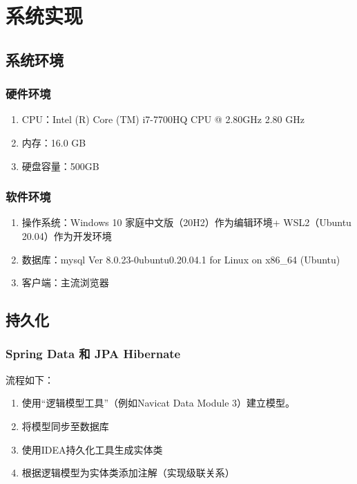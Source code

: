 
\chapter{系统实现}
\label{系统实现}

\section{系统环境}

\subsection{硬件环境}

\begin{enumerate}
  \item CPU：Intel (R) Core (TM) i7-7700HQ CPU @ 2.80GHz   2.80 GHz
  \item 内存：16.0 GB
  \item 硬盘容量：500GB
\end{enumerate}

\subsection{软件环境}

\begin{enumerate}
  \item 操作系统：Windows 10 家庭中文版（20H2）作为编辑环境+ WSL2（Ubuntu 20.04）作为开发环境
  \item 数据库：mysql Ver 8.0.23-0ubuntu0.20.04.1 for Linux on x86\_64 (Ubuntu)
  \item 客户端：主流浏览器
\end{enumerate}

\section{持久化}
\subsection{Spring Data 和 JPA Hibernate}

流程如下：

\begin{enumerate}
  \item 使用“逻辑模型工具”（例如Navicat Data Module 3）建立模型。
  \item 将模型同步至数据库
  \item 使用IDEA持久化工具生成实体类
  \item 根据逻辑模型为实体类添加注解（实现级联关系）
\end{enumerate}

